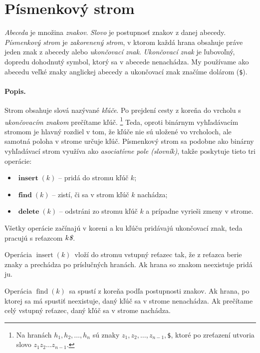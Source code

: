 
\def\k{k}
\def\put{$\mathop{insert}(\k)$}
\def\find{$\mathop{find}(\k)$}
\def\delete{$\mathop{delete}(\k)$}
\def\trie{trie}
\def\uz{{\tt\$}}

\section{Písmenkový strom}
\emph{Abeceda} je množina \emph{znakov}. \emph{Slovo} je postupnosť znakov 
z danej abecedy. \emph{Písmenkový strom} je \emph{zakorenený strom}, v ktorom 
každá hrana obsahuje práve jeden znak z abecedy alebo \emph{ukončovací znak}. 
\emph{Ukončovací znak} je ľubovoľný, dopredu dohodnutý symbol, ktorý sa 
v abecede nenachádza. My používame ako abecedu veľké znaky anglickej 
abecedy a ukončovací znak značíme dolárom (\uz).



\paragraph{Popis.}
Strom obsahuje slová nazývané \emph{kľúče}. Po prejdení cesty 
z koreňa do vrcholu s \emph{ukončovacím znakom} prečítame kľúč.%
\footnote{Na hranách $h_1, h_2, \ldots, h_n$ sú znaky $z_1, z_2, \ldots, 
z_{n-1}, $\uz, ktoré po zreťazení utvoria slovo $z_1z_2\ldots{z_{n-1}}$.} 
Teda, oproti binárnym vyhľadávacím stromom je hlavný rozdiel v tom, že 
kľúče nie sú uložené vo vrcholoch, ale samotná poloha v strome určuje kľúč. 
Písmenkový strom sa podobne ako binárny vyhľadávací strom využíva ako 
\emph{asociatívne pole (slovník)}, takže poskytuje tieto tri operácie:
\begin{itemize}
\item $\mathop{\mathbf{insert}}(\k)$ -- pridá do stromu kľúč $\k$;
\item $\mathop{\mathbf{find}}(\k)$ -- zistí, či sa v strom kľúč $\k$ nachádza;
\item $\mathop{\mathbf{delete}}(\k)$ -- odstráni zo stromu kľúč $\k$ a 
prípadne vyrieši zmeny v strome.
\end{itemize}
Všetky operácie začínajú v koreni a ku kľúču pridávajú ukončovací znak, 
teda pracujú s reťazcom $\k\emph{\$}$. 

Operácia \put\ vloží do stromu vstupný reťazec tak, že z reťazca berie znaky 
a prechádza po príslučných hranách. Ak hrana so znakom neexistuje pridá ju. 

Operácia \find\ sa spustí z koreňa podľa postupnosti znakov. Ak hrana, 
po ktorej sa má spustiť neexistuje, daný kľúč sa v strome nenachádza. 
Ak prečítame celý vstupný reťazec, daný kľúč sa v strome nachádza.

